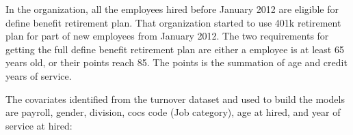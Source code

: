 \documentclass[12pt,letterpaper]{article}
\begin{document}
In the organization, all the employees hired before January 2012 are eligible for define benefit retirement plan. That organization started to use 401k retirement plan for part of new employees from January 2012. The two requirements for getting the full define benefit retirement plan are either a employee is at least 65 years old, or their points reach 85. The points is the summation of age and credit years of service.

The covariates identified from the turnover dataset and used to build the models are payroll, gender, division, cocs code (Job category), age at hired, and year of service at hired:
\end{document}
